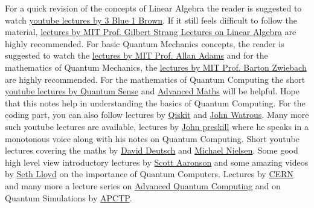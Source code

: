 \documentclass[12pt, oneside]{book}
\theoremstyle{definition}
\theoremstyle{definition}
\theoremstyle{remark}
\begin{document}
For a quick revision of the concepts of Linear Algebra the 
reader is suggested to watch \href{https://www.youtube.com/watch?v=fNk_zzaMoSs&list=PLZHQObOWTQDPD3MizzM2xVFitgF8hE_ab}{youtube lectures by 3 Blue 1 Brown}. If it still feels 
difficult to follow the material, \href{https://www.youtube.com/watch?v=7UJ4CFRGd-U&list=PL221E2BBF13BECF6C}{lectures by MIT Prof. Gilbert
Strang Lectures on Linear Algebra} are highly recommended. For basic Quantum Mechanics
concepts, the reader is suggested to watch the \href{https://www.youtube.com/watch?v=lZ3bPUKo5zc&list=PLUl4u3cNGP61-9PEhRognw5vryrSEVLPr}{lectures by MIT Prof. Allan Adams} and for the mathematics
of Quantum Mechanics, the \href{https://www.youtube.com/watch?v=jANZxzetPaQ&list=PLUl4u3cNGP60cspQn3N9dYRPiyVWDd80G}{lectures by MIT Prof. Barton Zwiebach} are highly recommended. For the 
mathematics of Quantum Computing the short \href{https://www.youtube.com/watch?v=3nvbBEzfmE8&list=PL8ER5-vAoiHAWm1UcZsiauUGPlJChgNXC}{youtube lectures by Quantum Sense} and \href{https://www.youtube.com/watch?v=zm64o27eHYw&list=PLxP0p--aBHmIe--9rczWe4AZmw03e2bz0}{Advanced Maths} will be helpful. Hope that this
notes help in understanding the basics of Quantum Computing. 
For the coding part, you can also follow lectures by \href{https://www.youtube.com/watch?v=Rs2TzarBX5I&list=PLOFEBzvs-VvrXTMy5Y2IqmSaUjfnhvBHR}{Qiskit} and \href{https://www.youtube.com/watch?v=42OiBzfdE2o&list=PLOFEBzvs-VvqKKMXX4vbi4EB1uaErFMSO}{John Watrous}.
Many more such youtube lectures are available, lectures by \href{https://www.youtube.com/watch?v=w08pSFsAZvE&list=PL0ojjrEqIyPy-1RRD8cTD_lF1hflo89Iu}{John preskill} where he speaks in a monotonous voice along with his notes on Quantum Computing.
Short youtube lectures covering the maths by \href{https://www.youtube.com/watch?v=mpkYPEaifUg&list=PLqdVnC7OWuEcfKRZXsrooK_EPzwmWSi-N}{David Deutsch} and \href{https://www.youtube.com/watch?v=X2q1PuI2RFI&list=PL1826E60FD05B44E4}{Michael Nielsen}.
Some good high level view introductory lectures by \href{https://www.youtube.com/watch?v=s1bxNomtaTE}{Scott Aaronson} and some amazing videos by \href{https://www.youtube.com/results?search_query=Quantum+Compting+Seth+lloyd}{Seth Lloyd} on the importance of Quantum Computers.
Lectures by \href{https://www.youtube.com/watch?v=jwHM8AHOtJ0&list=PL_rDPTSJrz8eFc6lb8twvsV39cxSwpJ6r}{CERN} and many more a lecture series on \href{https://www.youtube.com/watch?v=vOo1rI_RRJo&list=PLDOlG2kTN3Z4xwQmnjSQomAqr3YDyCreJ}{Advanced Quantum Computing} and on
Quantum Simulations by \href{https://www.youtube.com/watch?v=a2ZxgUc20LE&list=PLf3vbYicbcT_l-qgpta8_K8gYH0JVmoL8}{APCTP}.
\end{document}
